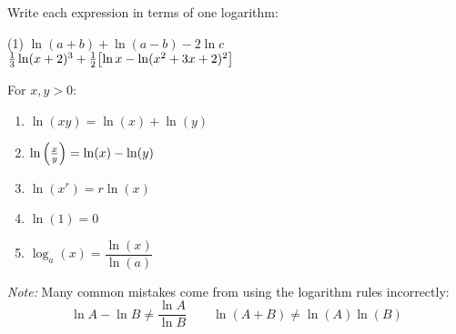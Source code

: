 \documentclass[../mathNotesPreamble]{subfiles}
\begin{document}
  \begin{ex*}
    Write each expression in terms of one logarithm:\\
    
    \noindent
    \begin{minipage}{0.55\linewidth}
      \begin{extasks}(1)
        \task $\ln(a+b)+\ln(a-b)-2\ln c$\\[70pt]
        \task $\frac{1}{3}\ln(x+2)^3 +\frac{1}{2}{\left[\ln x-\ln(x^2+3x+2)^2\right]}$\\[30pt]
      \end{extasks}
    \end{minipage}%
    \begin{minipage}{0.45\linewidth}
      \begin{flushright}
        \begin{thmBox*}
          For $x,y>0$:
            \begin{enumerate}
              \item $\ln(xy)=\ln(x)+\ln(y)$
              \item $\ln{\left(\frac{x}{y}\right)}=\ln(x)-\ln(y)$
              \item $\ln(x^r)=r\ln(x)$
              \item $\ln(1)=0$
              \item $\log_a(x)=\dfrac{\ln(x)}{\ln(a)}$
            \end{enumerate}
        \end{thmBox*}
      \end{flushright}
    \end{minipage}
  \end{ex*}

  \begin{center}
    \begin{thmBox*}
      \textit{Note:} Many common mistakes come from using the logarithm rules incorrectly:
      $$\ln A-\ln B\neq \dfrac{\ln A}{\ln B}\qquad \ln(A+B)\neq\ln(A)\ln(B)$$
    \end{thmBox*}
  \end{center}
  \pagebreak
\end{document}
